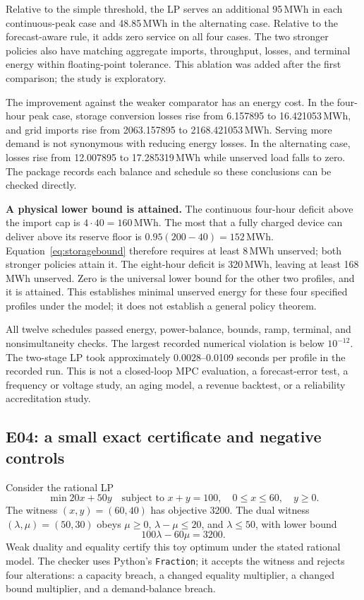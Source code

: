 \documentclass[11pt,letterpaper]{article}
\begin{document}
Relative to the simple threshold, the LP serves an additional 95\,MWh in each continuous-peak case and 48.85\,MWh in the alternating case. Relative to the forecast-aware rule, it adds zero service on all four cases. The two stronger policies also have matching aggregate imports, throughput, losses, and terminal energy within floating-point tolerance. This ablation was added after the first comparison; the study is exploratory.

The improvement against the weaker comparator has an energy cost. In the four-hour peak case, storage conversion losses rise from 6.157895 to 16.421053\,MWh, and grid imports rise from 2063.157895 to 2168.421053\,MWh. Serving more demand is not synonymous with reducing energy losses. In the alternating case, losses rise from 12.007895 to 17.285319\,MWh while unserved load falls to zero. The package records each balance and schedule so these conclusions can be checked directly.

\textbf{A physical lower bound is attained.} The continuous four-hour deficit above the import cap is $4\cdot40=160$\,MWh. The most that a fully charged device can deliver above its reserve floor is $0.95(200-40)=152$\,MWh. Equation~\eqref{eq:storagebound} therefore requires at least 8\,MWh unserved; both stronger policies attain it. The eight-hour deficit is 320\,MWh, leaving at least 168\,MWh unserved. Zero is the universal lower bound for the other two profiles, and it is attained. This establishes minimal unserved energy for these four specified profiles under the model; it does not establish a general policy theorem.

All twelve schedules passed energy, power-balance, bounds, ramp, terminal, and nonsimultaneity checks. The largest recorded numerical violation is below $10^{-12}$. The two-stage LP took approximately 0.0028--0.0109 seconds per profile in the recorded run. This is not a closed-loop MPC evaluation, a forecast-error test, a frequency or voltage study, an aging model, a revenue backtest, or a reliability accreditation study.

\subsection{E04: a small exact certificate and negative controls}
Consider the rational LP
\[
 \min 20x+50y\quad\text{subject to }x+y=100,\quad0\le x\le60,\quad y\ge0.
\]
The witness $(x,y)=(60,40)$ has objective 3200. The dual witness $(\lambda,\mu)=(50,30)$ obeys $\mu\ge0$, $\lambda-\mu\le20$, and $\lambda\le50$, with lower bound
\[
 100\lambda-60\mu=3200.
\]
Weak duality and equality certify this toy optimum under the stated rational model. The checker uses Python's \texttt{Fraction}; it accepts the witness and rejects four alterations: a capacity breach, a changed equality multiplier, a changed bound multiplier, and a demand-balance breach.
\end{document}
